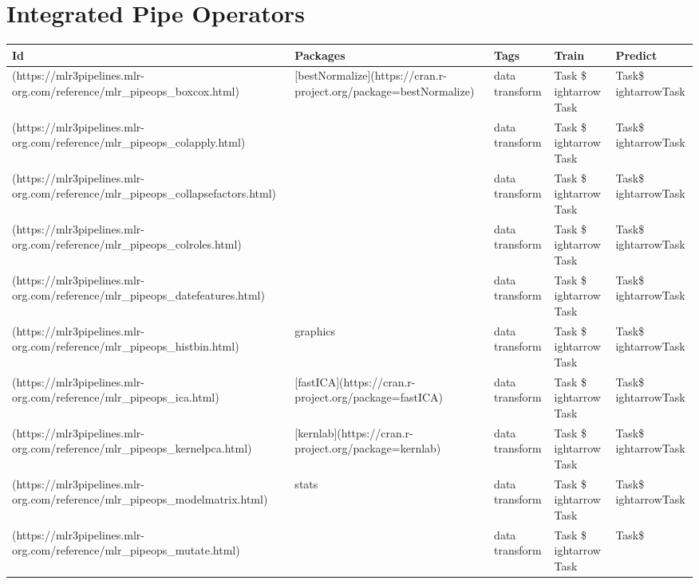 \documentclass[
]{scrbook}
\begin{document}
\hypertarget{list-pipeops}{%
\section{Integrated Pipe Operators}\label{list-pipeops}}

\begin{tabular}{l|l|l|l|l}
\hline
Id & Packages & Tags & Train & Predict\\
\hline
[`boxcox`](https://mlr3pipelines.mlr-org.com/reference/mlr\_pipeops\_boxcox.html) & [bestNormalize](https://cran.r-project.org/package=bestNormalize) & data transform & Task \$
ightarrow Task & Task\$
ightarrowTask\\
\hline
[`colapply`](https://mlr3pipelines.mlr-org.com/reference/mlr\_pipeops\_colapply.html) &  & data transform & Task \$
ightarrow Task & Task\$
ightarrowTask\\
\hline
[`collapsefactors`](https://mlr3pipelines.mlr-org.com/reference/mlr\_pipeops\_collapsefactors.html) &  & data transform & Task \$
ightarrow Task & Task\$
ightarrowTask\\
\hline
[`colroles`](https://mlr3pipelines.mlr-org.com/reference/mlr\_pipeops\_colroles.html) &  & data transform & Task \$
ightarrow Task & Task\$
ightarrowTask\\
\hline
[`datefeatures`](https://mlr3pipelines.mlr-org.com/reference/mlr\_pipeops\_datefeatures.html) &  & data transform & Task \$
ightarrow Task & Task\$
ightarrowTask\\
\hline
[`histbin`](https://mlr3pipelines.mlr-org.com/reference/mlr\_pipeops\_histbin.html) & graphics & data transform & Task \$
ightarrow Task & Task\$
ightarrowTask\\
\hline
[`ica`](https://mlr3pipelines.mlr-org.com/reference/mlr\_pipeops\_ica.html) & [fastICA](https://cran.r-project.org/package=fastICA) & data transform & Task \$
ightarrow Task & Task\$
ightarrowTask\\
\hline
[`kernelpca`](https://mlr3pipelines.mlr-org.com/reference/mlr\_pipeops\_kernelpca.html) & [kernlab](https://cran.r-project.org/package=kernlab) & data transform & Task \$
ightarrow Task & Task\$
ightarrowTask\\
\hline
[`modelmatrix`](https://mlr3pipelines.mlr-org.com/reference/mlr\_pipeops\_modelmatrix.html) & stats & data transform & Task \$
ightarrow Task & Task\$
ightarrowTask\\
\hline
[`mutate`](https://mlr3pipelines.mlr-org.com/reference/mlr\_pipeops\_mutate.html) &  & data transform & Task \$
ightarrow Task & Task\$

\end{tabular}
\end{document}
